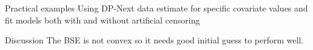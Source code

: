 \documentclass{beamer}\usepackage{listings}
\begin{document}
\begin{frame}[label={sec:orgfe5f16e}]{Practical examples}
Using DP-Next data estimate for specific covariate values and fit models both with and without artificial censoring
\end{frame}


\begin{frame}[label={sec:org1273f6c}]{Discussion}
The BSE is not convex so it needs good initial guess to perform well.
\vfill
\end{frame}
\end{document}
